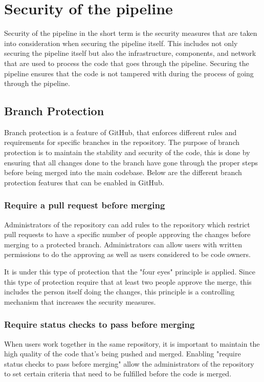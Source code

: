 \section{Security of the pipeline}
Security of the pipeline in the short term is the security measures that are taken into consideration when securing the pipeline itself. This includes not only securing the pipeline itself but also the infrastructure, components, and network that are used to process the code that goes through the pipeline. Securing the pipeline ensures that the code is not tampered with during the process of going through the pipeline. 


\subsection{Branch Protection}
\label{branchprotection}
Branch protection is a feature of GitHub, that enforces different rules and requirements for specific branches in the repository. The purpose of branch protection is to maintain the stability and security of the code, this is done by ensuring that all changes done to the branch have gone through the proper steps before being merged into the main codebase. Below are the different branch protection features that can be enabled in GitHub. \cite{ProtectedBranches}
\\
\subsubsection{Require a pull request before merging}
Administrators of the repository can add rules to the repository which restrict pull requests to have a specific number of people approving the changes before merging to a protected branch. Administrators can allow users with written permissions to do the approving as well as users considered to be code owners. 

It is under this type of protection that the "four eyes" principle is applied. Since this type of protection require that at least two people approve the merge, this includes the person itself doing the changes, this principle is a controlling mechanism that increases the security measures. 
\\
\subsubsection{Require status checks to pass before merging}
When users work together in the same repository, it is important to maintain the high quality of the code that's being pushed and merged. Enabling "require status checks to pass before merging" allow the administrators of the repository to set certain criteria that need to be fulfilled before the code is merged. 

